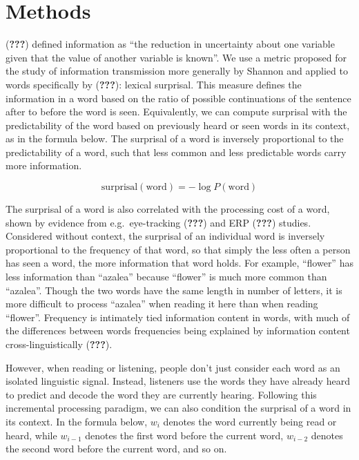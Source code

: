 \documentclass[10pt, letterpaper]{article}
\begin{document}
\hypertarget{methods}{%
\section{Methods}\label{methods}}

({\textbf{???}}) defined information as ``the reduction in uncertainty
about one variable given that the value of another variable is known''.
We use a metric proposed for the study of information transmission more
generally by Shannon and applied to words specifically by
({\textbf{???}}): lexical surprisal. This measure defines the
information in a word based on the ratio of possible continuations of
the sentence after to before the word is seen. Equivalently, we can
compute surprisal with the predictability of the word based on
previously heard or seen words in its context, as in the formula below.
The surprisal of a word is inversely proportional to the predictability
of a word, such that less common and less predictable words carry more
information.

\[\text{surprisal}(\text{word}) = -\log P(\text{word})\]

The surprisal of a word is also correlated with the processing cost of a
word, shown by evidence from e.g.~eye-tracking ({\textbf{???}}) and ERP
({\textbf{???}}) studies. Considered without context, the surprisal of
an individual word is inversely proportional to the frequency of that
word, so that simply the less often a person has seen a word, the more
information that word holds. For example, ``flower'' has less
information than ``azalea'' because ``flower'' is much more common than
``azalea''. Though the two words have the same length in number of
letters, it is more difficult to process ``azalea'' when reading it here
than when reading ``flower''. Frequency is intimately tied information
content in words, with much of the differences between words frequencies
being explained by information content cross-linguistically
({\textbf{???}}).

However, when reading or listening, people don't just consider each word
as an isolated linguistic signal. Instead, listeners use the words they
have already heard to predict and decode the word they are currently
hearing. Following this incremental processing paradigm, we can also
condition the surprisal of a word in its context. In the formula below,
\(w_i\) denotes the word currently being read or heard, while
\(w_{i-1}\) denotes the first word before the current word, \(w_{i-2}\)
denotes the second word before the current word, and so on.
\end{document}
